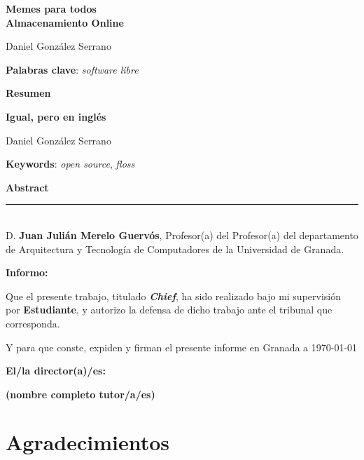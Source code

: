 \thispagestyle{empty}

\begin{center}
{\large\bfseries Memes para todos \\ Almacenamiento Online }\\
\end{center}
\begin{center}
Daniel González Serrano\\
\end{center}


\vspace{0.5cm}
\noindent\textbf{Palabras clave}: \textit{software libre}
\vspace{0.7cm}

\noindent\textbf{Resumen}
	

\cleardoublepage

\begin{center}
	{\large\bfseries Igual, pero en inglés}\\
\end{center}
\begin{center}
	Daniel González Serrano\\
\end{center}
\vspace{0.5cm}
\noindent\textbf{Keywords}: \textit{open source}, \textit{floss}
\vspace{0.7cm}

\noindent\textbf{Abstract}


\cleardoublepage

\thispagestyle{empty}

\noindent\hspace*{-\parindent}\rule[-1ex]{\textwidth}{2pt}\\[4.5ex]

D. \textbf{Juan Julián Merelo Guervós}, Profesor(a) del Profesor(a) del departamento de Arquitectura y Tecnología de Computadores de la Universidad de Granada.

\vspace{0.5cm}

\textbf{Informo:}

\vspace{0.5cm}

Que el presente trabajo, titulado \textit{\textbf{Chief}},
ha sido realizado bajo mi supervisión por \textbf{Estudiante}, y autorizo la defensa de dicho trabajo ante el tribunal
que corresponda.

\vspace{0.5cm}

Y para que conste, expiden y firman el presente informe en Granada a \today

\vspace{1cm}

\textbf{El/la director(a)/es: }

\vspace{5cm}

\noindent \textbf{(nombre completo tutor/a/es)}

\chapter*{Agradecimientos}




